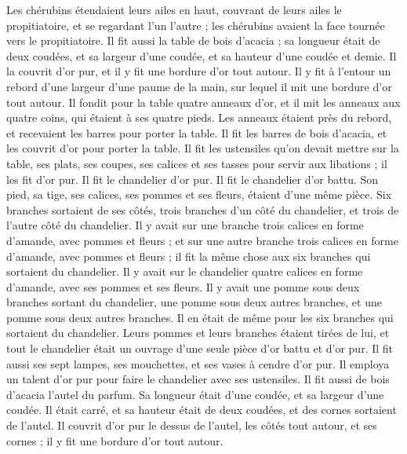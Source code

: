 \begin{multicols}{2}
Les chérubins étendaient leurs ailes en haut, couvrant de leurs ailes le propitiatoire, et se regardant l’un l’autre ; les chérubins avaient la face tournée vers le propitiatoire.
Il fit aussi la table de bois d’acacia ; sa longueur était de deux coudées, et sa largeur d'une coudée, et sa hauteur d'une coudée et demie.
Il la couvrit d’or pur, et il y fit une bordure d’or tout autour.
Il y fit à l'entour un rebord d’une largeur d’une paume de la main, sur lequel il mit une bordure d’or tout autour.
Il fondit pour la table quatre anneaux d'or, et il mit les anneaux aux quatre coins, qui étaient à ses quatre pieds.
Les anneaux étaient près du rebord, et recevaient les barres pour porter la table.
Il fit les barres de bois d’acacia, et les couvrit d'or pour porter la table.
Il fit les ustensiles qu’on devait mettre sur la table, ses plats, ses coupes, ses calices et ses tasses pour servir aux libations ; il les fit d’or pur.
Il fit le chandelier d’or pur. Il fit le chandelier d’or battu. Son pied, sa tige, ses calices, ses pommes et ses fleurs, étaient d’une même pièce.
Six branches sortaient de ses côtés, trois branches d'un côté du chandelier, et trois de l'autre côté du chandelier.
Il y avait sur une branche trois calices en forme d'amande, avec pommes et fleurs ; et sur une autre branche trois calices en forme d'amande, avec pommes et fleurs ; il fit la même chose aux six branches qui sortaient du chandelier.
Il y avait sur le chandelier quatre calices en forme d'amande, avec ses pommes et ses fleurs.
Il y avait une pomme sous deux branches sortant du chandelier, une pomme sous deux autres branches, et une pomme sous deux autres branches. Il en était de même pour les six branches qui sortaient du chandelier.
Leurs pommes et leurs branches étaient tirées de lui, et tout le chandelier était un ouvrage d'une seule pièce d’or battu et d’or pur.
Il fit aussi ses sept lampes, ses mouchettes, et ses vases à cendre d’or pur.
Il employa un talent d’or pur pour faire le chandelier avec ses ustensiles.
Il fit aussi de bois d’acacia l'autel du parfum. Sa longueur était d'une coudée, et sa largeur d'une coudée. Il était carré, et sa hauteur était de deux coudées, et des cornes sortaient de l’autel.
Il couvrit d’or pur le dessus de l'autel, les côtés tout autour, et ses cornes ; il y fit une bordure d’or tout autour.

\end{multicols}
